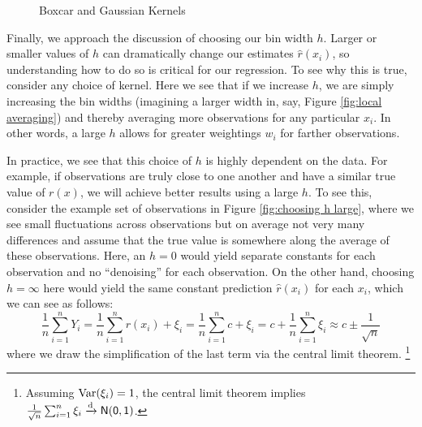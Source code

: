 \begin{figure}
	\begin{center}
		\caption{Boxcar and Gaussian Kernels}
		\label{fig:kernels}
	\end{center}
\end{figure}

Finally, we approach the discussion of choosing our bin width $h$. Larger or smaller values of $h$ can dramatically change our estimates $\hat{r}(x_i)$, so understanding how to do so is critical for our regression. To see why this is true, consider any choice of kernel. Here we see that if we increase $h$, we are simply increasing the bin widths (imagining a larger width in, say, Figure \ref{fig:local averaging}) and thereby averaging more observations for any particular $x_i$. In other words, a large $h$ allows for greater weightings $w_i$ for farther observations. 

In practice, we see that this choice of $h$ is highly dependent on the data. For example, if observations are truly close to one another and have a similar true value of $r(x)$, we will achieve better results using a large $h$. To see this, consider the example set of observations in Figure \ref{fig:choosing h large}, where we see small fluctuations across observations but on average not very many differences and assume that the true value is somewhere along the average of these observations. Here, an $h = 0$ would yield separate constants for each observation and no ``denoising'' for each observation. On the other hand, choosing $h = \infty$ here would yield the same  constant prediction $\hat{r}(x_i)$ for each $x_i$, which we can see as follows: \begin{equation}\frac{1}{n}\sum_{i =1}^n Y_i = \frac{1}{n}\sum_{i =1}^n r(x_i) + \xi_i = \frac{1}{n}\sum_{i =1}^n c + \xi_i = c + \frac{1}{n}\sum_{i =1}^n \xi_i \approx c \pm \frac{1}{\sqrt{n}} \end{equation}
where we draw the simplification of the last term via the central limit theorem. \footnote{Assuming $\operatorname{Var}(\xi_i) =1$, the central limit theorem implies $\frac{1}{\sqrt n} \sum_{i =1}^n \xi_i \xrightarrow{\mathrm d} \sf{N}(0,1)$.}

